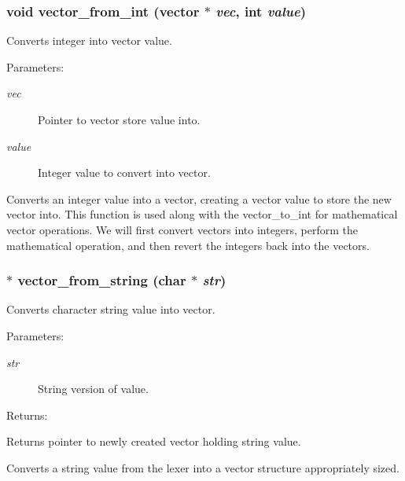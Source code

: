 \subsubsection{\setlength{\rightskip}{0pt plus 5cm}void vector\_\-from\_\-int ({\bf vector} $\ast$ {\em vec}, int {\em value})}\label{vector_8h_a16}


Converts integer into vector value.

\begin{Desc}
\item[Parameters: ]\par
\begin{description}
\item[{\em 
vec}]Pointer to vector store value into. \item[{\em 
value}]Integer value to convert into vector.\end{description}
\end{Desc}
Converts an integer value into a vector, creating a vector value to store the new vector into. This function is used along with the vector\_\-to\_\-int for mathematical vector operations. We will first convert vectors into integers, perform the mathematical operation, and then revert the integers back into the vectors. 
\subsubsection{$\ast$ vector\_\-from\_\-string (char $\ast$ {\em str})}\label{vector_8h_a18}


Converts character string value into vector.

\begin{Desc}
\item[Parameters: ]\par
\begin{description}
\item[{\em 
str}]String version of value.\end{description}
\end{Desc}
\begin{Desc}
\item[Returns: ]\par
Returns pointer to newly created vector holding string value.\end{Desc}
Converts a string value from the lexer into a vector structure appropriately sized. 
